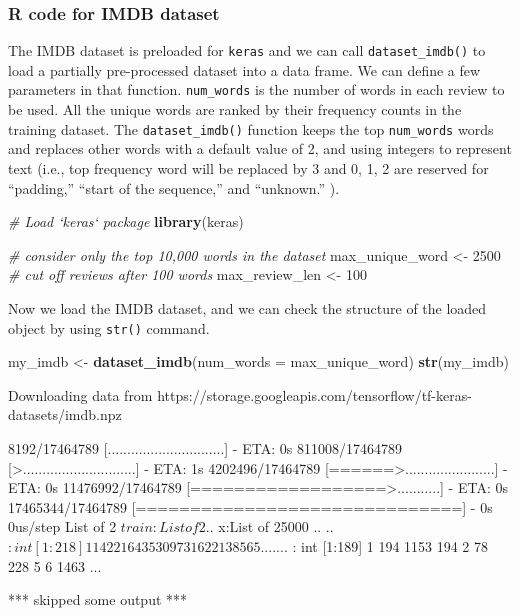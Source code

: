 \documentclass[12pt,]{krantz}
\makeatletter
\newenvironment{Shaded}{\begin{snugshade}}{\end{snugshade}}
\newcommand{\CommentTok}[1]{\textcolor[rgb]{0.37,0.37,0.37}{\textit{#1}}}
\newcommand{\DataTypeTok}[1]{\textcolor[rgb]{0.27,0.27,0.27}{#1}}
\newcommand{\DecValTok}[1]{\textcolor[rgb]{0.06,0.06,0.06}{#1}}
\newcommand{\KeywordTok}[1]{\textcolor[rgb]{0.27,0.27,0.27}{\textbf{#1}}}
\newcommand{\NormalTok}[1]{#1}
\newcommand{\StringTok}[1]{\textcolor[rgb]{0.5,0.5,0.5}{#1}}
\newenvironment{kframe}{%
\medskip{}
\setlength{\fboxsep}{.8em}
 \def\at@end@of@kframe{}%
 \ifinner\ifhmode%
  \def\at@end@of@kframe{\end{minipage}}%
  \begin{minipage}{\columnwidth}%
 \fi\fi%
 \def\FrameCommand##1{\hskip\@totalleftmargin \hskip-\fboxsep
 \colorbox{shadecolor}{##1}\hskip-\fboxsep
     \hskip-\linewidth \hskip-\@totalleftmargin \hskip\columnwidth}%
 \MakeFramed {\advance\hsize-\width
   \@totalleftmargin\z@ \linewidth\hsize
   \@setminipage}}%
 {\par\unskip\endMakeFramed%
 \at@end@of@kframe}
\renewenvironment{Shaded}{\begin{kframe}}{\end{kframe}}
\makeatother
\begin{document}
\hypertarget{r-code-for-imdb-dataset}{%
\subsubsection{R code for IMDB dataset}\label{r-code-for-imdb-dataset}}

The IMDB dataset is preloaded for \texttt{keras} and we can call \texttt{dataset\_imdb()} to load a partially pre-processed dataset into a data frame. We can define a few parameters in that function. \texttt{num\_words} is the number of words in each review to be used. All the unique words are ranked by their frequency counts in the training dataset. The \texttt{dataset\_imdb()} function keeps the top \texttt{num\_words} words and replaces other words with a default value of 2, and using integers to represent text (i.e., top frequency word will be replaced by 3 and 0, 1, 2 are reserved for ``padding,'' ``start of the sequence,'' and ``unknown.'' ).

\begin{Shaded}
\begin{Highlighting}[]
\CommentTok{# Load `keras` package}
\KeywordTok{library}\NormalTok{(keras)}

\CommentTok{# consider only the top 10,000 words in the dataset}
\NormalTok{max_unique_word <-}\StringTok{ }\DecValTok{2500}
\CommentTok{# cut off reviews after 100 words}
\NormalTok{max_review_len <-}\StringTok{ }\DecValTok{100}
\end{Highlighting}
\end{Shaded}

Now we load the IMDB dataset, and we can check the structure of the loaded object by using \texttt{str()} command.

\begin{Shaded}
\begin{Highlighting}[]
\NormalTok{my_imdb <-}\StringTok{ }\KeywordTok{dataset_imdb}\NormalTok{(}\DataTypeTok{num_words =}\NormalTok{ max_unique_word)}
\KeywordTok{str}\NormalTok{(my_imdb)}
\end{Highlighting}
\end{Shaded}

\begin{Shaded}
\begin{Highlighting}[]
\NormalTok{Downloading data from}
\NormalTok{https://storage.googleapis.com/tensorflow/tf-keras-datasets/imdb.npz}

\NormalTok{    8192/17464789 [..............................] - ETA: 0s}
\NormalTok{  811008/17464789 [>.............................] - ETA: 1s}
\NormalTok{ 4202496/17464789 [======>.......................] - ETA: 0s}
\NormalTok{11476992/17464789 [==================>...........] - ETA: 0s}
\NormalTok{17465344/17464789 [==============================] - 0s 0us/step}
\NormalTok{List of 2}
\NormalTok{ $ train:List of 2}
\NormalTok{  ..$ x:List of 25000}
\NormalTok{  .. ..$ : int [1:218] 1 14 22 16 43 530 973 1622 1385 65 ...}
\NormalTok{  .. ..$ : int [1:189] 1 194 1153 194 2 78 228 5 6 1463 ...}
  
\NormalTok{*** skipped some output ***}
\end{Highlighting}
\end{Shaded}
\end{document}
